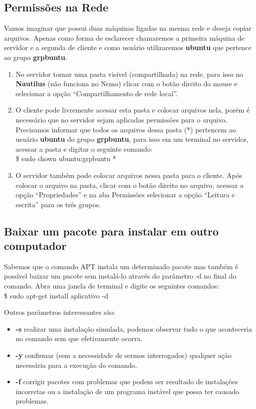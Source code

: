 \subsection{Permissões na Rede}
Vamos imaginar que possui duas máquinas ligadas na mesma rede e deseja copiar arquivos. Apenas como forma de esclarecer chamaremos a primeira máquina de servidor e a segunda de cliente e como usuário utilizaremos \textbf{ubuntu} que pertence ao grupo \textbf{grpbuntu}. \vspace{-1em}
\begin{enumerate}
 \item No servidor tornar uma pasta visível (compartilhada) na rede, para isso no \textbf{Nautilus} (não funciona no Nemo) clicar com o botão direito do mouse e selecionar a opção ``Compartilhamento de rede local''.
 \item O cliente pode livremente acessar esta pasta e colocar arquivos nela, porém é necessário que no servidor sejam aplicadas permissões para o arquivo. Precisamos informar que todos os arquivos dessa pasta (*) pertencem ao usuário \textbf{ubuntu} do grupo \textbf{grpbuntu}, para isso em um terminal no servidor, acessar a pasta e digitar o seguinte comando: \\
 {\ttfamily\$ sudo chown ubuntu:grpbuntu *}
 \item O servidor também pode colocar arquivos nessa pasta para o cliente. Após colocar o arquivo na pasta, clicar com o botão direito no arquivo, acessar a opção “Propriedades” e na aba Permissões selecionar a opção “Leitura e escrita” para os três grupos.
\end{enumerate}

\subsection{Baixar um pacote para instalar em outro computador}
Sabemos que o comando APT instala um determinado pacote mas também é possível baixar um pacote sem instalá-lo através do parâmetro -d no final do comando. Abra uma janela de terminal e digite os seguintes comandos: \\
{\ttfamily\$ sudo apt-get install aplicativo -d}

Outros parâmetros interessantes são: \vspace{-1em}
\begin{itemize}[noitemsep]
 \item \textbf{-s} realizar uma instalação simulada, podemos observar tudo o que aconteceria no comando sem que efetivamente ocorra. 
 \item \textbf{-y} confirmar (sem a necessidade de sermos interrogados) qualquer ação necessária para a execução do comando.
 \item \textbf{-f} corrigir pacotes com problemas que podem ser resultado de instalações incorretas ou a instalação de um programa instável que possa ter causado problemas.
\end{itemize}

